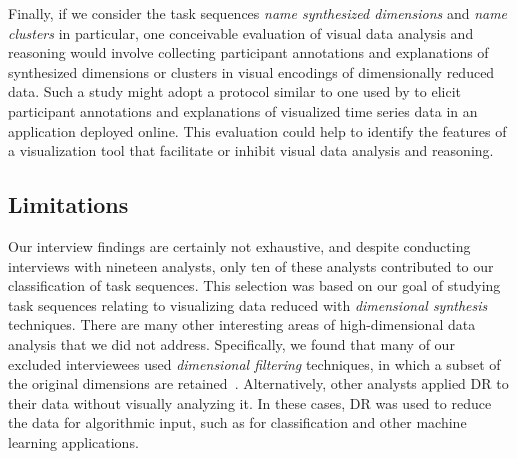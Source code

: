 Finally, if we consider the task sequences {\it name synthesized dimensions} and {\it name clusters} in particular, one conceivable evaluation of visual data analysis and reasoning would involve collecting participant annotations and explanations of synthesized dimensions or clusters in visual encodings of dimensionally reduced data.
Such a study might adopt a protocol similar to one used by \citet{Willett2012} to elicit participant annotations and explanations of visualized time series data in an application deployed online.
This evaluation could help to identify the features of a visualization tool that facilitate or inhibit visual data analysis and reasoning.


\subsection{Limitations}
\label{drvistasks:discussion:limitations}


Our interview findings are certainly not exhaustive, and despite conducting interviews with nineteen analysts, only ten of these analysts contributed to our classification of task sequences. 
This selection was based on our goal of studying task sequences relating to visualizing data reduced with {\it dimensional synthesis} techniques.
There are many other interesting areas of high-dimensional data analysis that we did not address. 
Specifically, we found that many of our excluded interviewees used {\it dimensional filtering} techniques, in which a subset of the original dimensions are retained~\cite{Johansson2009,Yang2003}. 
Alternatively, other analysts applied \ac{DR} to their data without visually analyzing it. 
In these cases, \ac{DR} was used to reduce the data for algorithmic input, such as for classification and other machine learning applications. 

